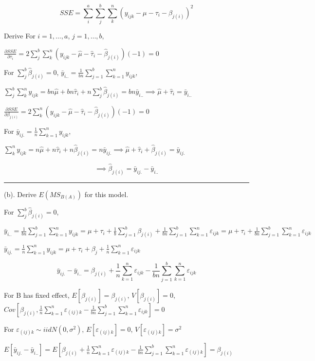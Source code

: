 \documentclass[12pt,]{article}
\begin{document}
\[SSE=\sum_i^a\sum_j^b\sum_k^n(y_{ijk}-\mu-\tau_i-\beta_{j(i)})^2\]

Derive For \(i=1,…,a\), \(j=1,…,b\),

\(\frac{\partial SSE}{\partial \tau_i}=2\sum_j^b\sum_k^n(y_{ijk}-\hat\mu-\hat\tau_i-\hat\beta_{j(i)})(-1)=0\)

For \(\sum_j^b\hat\beta_{j(i)}=0\),
\(\bar y_{i..}=\frac1{bn}\sum_{j=1}^b\sum_{k=1}^ny_{ijk}\),

\(\sum_j^b\sum_k^ny_{ijk}=bn\hat\mu+bn\hat\tau_i+n\sum_j^b\hat\beta_{j(i)}=bn\bar y_{i..}\implies \hat\mu+\hat\tau_i=\bar y_{i..}\)

\(\frac{\partial SSE}{\partial \beta_{j(i)}}=2\sum_k^n(y_{ijk}-\hat\mu-\hat\tau_i-\hat\beta_{j(i)})(-1)=0\)

For \(\bar y_{ij.}=\frac1n\sum_{k=1}^ny_{ijk}\),

\(\sum_k^ny_{ijk}=n\hat\mu+n\hat\tau_i+n\hat\beta_{j(i)}=n\bar y_{ij.}\implies \hat\mu+\hat\tau_i+\hat\beta_{j(i)}=\bar y_{ij.}\)

\[\implies \hat\beta_{j(i)}=\bar y_{ij.}-\bar y_{i..}\]

\begin{center}\rule{0.5\linewidth}{\linethickness}\end{center}

(b). \textcolor[rgb]{0.7,0.7,0.7}{Derive $E(MS_{B(A)})$ for this model.}

For \(\sum_j^b\hat\beta_{j(i)}=0\),

\(\bar y_{i..}=\frac1{bn}\sum_{j=1}^b\sum_{k=1}^ny_{ijk}=\mu+\tau_{i}+\frac1b \sum_{j=1}^b\beta_{j(i)}+\frac1{bn}\sum_{j=1}^b\sum_{k=1}^n\varepsilon_{ijk}=\mu+\tau_{i}+\frac1{bn}\sum_{j=1}^b\sum_{k=1}^n\varepsilon_{ijk}\)

\(\bar y_{ij.}=\frac1{n}\sum_{k=1}^ny_{ijk}=\mu+\tau_{i}+\beta_j+\frac1{n}\sum_{k=1}^n\varepsilon_{ijk}\)

\[\bar y_{ij.}-\bar y_{i..}=\beta_{j(i)}+\frac1{n}\sum_{k=1}^n\varepsilon_{ijk}-\frac1{bn}\sum_{j=1}^b\sum_{k=1}^n\varepsilon_{ijk}\]

For B has fixed effect, \(E[\beta_{j(i)}]=\beta_{j(i)}\),
\(V[\beta_{j(i)}]=0\),
\(Cov[\beta_{j(i)},\frac1{n}\sum_{k=1}^n\varepsilon_{(ij)k}-\frac1{bn}\sum_{j=1}^b\sum_{k=1}^n\varepsilon_{ijk}]=0\)

For \(\varepsilon_{(ij)k}\sim iid N(0,\sigma^2)\),
\(E[\varepsilon_{(ij)k}]=0\), \(V[\varepsilon_{(ij)k}]=\sigma^2\)

\(E[\bar y_{ij.}-\bar y_{i..}]=E[\beta_{j(i)}+\frac1{n}\sum_{k=1}^n\varepsilon_{(ij)k}-\frac1{bn}\sum_{j=1}^b\sum_{k=1}^n\varepsilon_{(ij)k}]=\beta_{j(i)}\)
\end{document}
